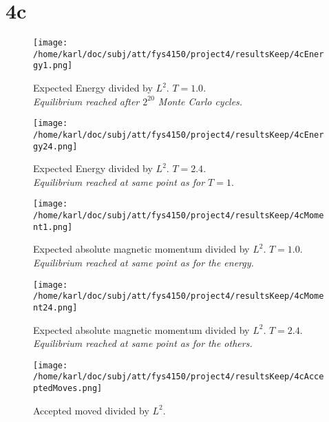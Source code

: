\documentclass{article}
\begin{document}
\section{4c}

\begin{minipage}{.45\textwidth} 
	\begin{figure}[H]
		\centering
		\texttt{[image: /home/karl/doc/subj/att/fys4150/project4/resultsKeep/4cEnergy1.png]}
		\caption{Expected Energy divided by $L^2$. $T=1.0$. \\ \textit{Equilibrium reached after $2^{20}$ Monte Carlo cycles.}}
		\label{1}
	\end{figure}
\end{minipage}\hfill
\begin{minipage}{.45\textwidth} 
	\begin{figure}[H]
		\centering
		\texttt{[image: /home/karl/doc/subj/att/fys4150/project4/resultsKeep/4cEnergy24.png]}
		\caption{Expected Energy divided by $L^2$. $T = 2.4$. \\ \textit{Equilibrium reached at same point as for $T=1$}.}
		\label{1}
	\end{figure}
\end{minipage}\hfill
\vspace{2ex}

\begin{minipage}{.45\textwidth} 
	\begin{figure}[H]
		\centering
		\texttt{[image: /home/karl/doc/subj/att/fys4150/project4/resultsKeep/4cMoment1.png]}
		\caption{Expected absolute magnetic momentum divided by $L^2$. $T = 1.0$. \\ \textit{Equilibrium reached at same point as for the energy.}}
		\label{1}
	\end{figure}
\end{minipage}\hfill
\begin{minipage}{.45\textwidth} 
	\begin{figure}[H]
		\centering
		\texttt{[image: /home/karl/doc/subj/att/fys4150/project4/resultsKeep/4cMoment24.png]}
		\caption{Expected absolute magnetic momentum divided by $L^2$. $T = 2.4$. \\ \textit{Equilibrium reached at same point as for the others.}}
		\label{1}
	\end{figure}
\end{minipage}\hfill
\vspace{2ex}

\begin{figure}[H]
	\centering
	\texttt{[image: /home/karl/doc/subj/att/fys4150/project4/resultsKeep/4cAcceptedMoves.png]}
	\caption{Accepted moved divided by $L^2$. \\ \textit{}}
	\label{1}
\end{figure}
\end{document}
